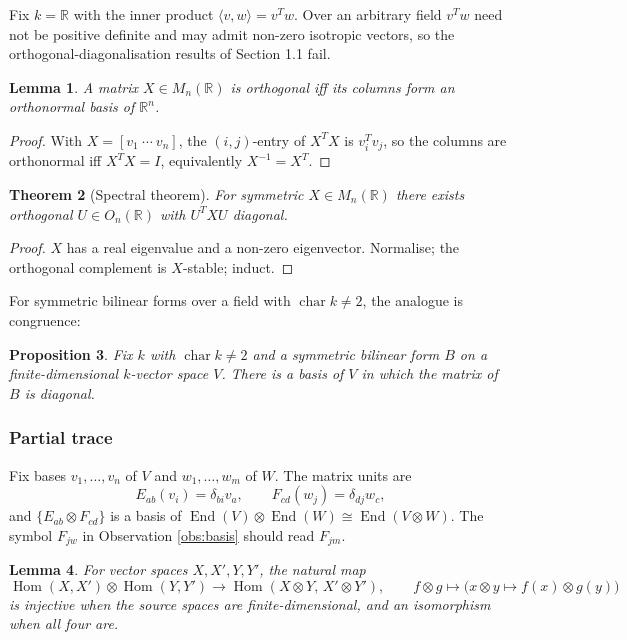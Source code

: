 \documentclass[12pt]{article}
\theoremstyle{plain}
\newtheorem{thm}{Theorem}[subsection] %
\newtheorem{proposition}[thm]{Proposition}
\newtheorem{lemma}[thm]{Lemma}
\theoremstyle{definition}
\begin{document}
Fix $k=\mathbb{R}$ with the inner product $\langle v,w\rangle=v^Tw$. Over an arbitrary field $v^Tw$ need not be positive definite and may admit non-zero isotropic vectors, so the orthogonal-diagonalisation results of Section 1.1 fail.

\begin{lemma}\label{lem:orthonormal_corr}
A matrix $X\in M_n(\mathbb{R})$ is orthogonal iff its columns form an orthonormal basis of $\mathbb{R}^n$.
\end{lemma}
\begin{proof}
With $X=[v_1\ \cdots\ v_n]$, the $(i,j)$-entry of $X^TX$ is $v_i^Tv_j$, so the columns are orthonormal iff $X^TX=I$, equivalently $X^{-1}=X^T$.
\end{proof}

\begin{thm}[Spectral theorem]\label{thm:spectral_real}
For symmetric $X\in M_n(\mathbb{R})$ there exists orthogonal $U\in O_n(\mathbb{R})$ with $U^TXU$ diagonal.
\end{thm}
\begin{proof}
$X$ has a real eigenvalue and a non-zero eigenvector. Normalise; the orthogonal complement is $X$-stable; induct.
\end{proof}

For symmetric bilinear forms over a field with $\operatorname{char}k\ne 2$, the analogue is congruence:
\begin{proposition}\label{prop:cong_diag}
Fix $k$ with $\operatorname{char}k\ne 2$ and a symmetric bilinear form $B$ on a finite-dimensional $k$-vector space $V$. There is a basis of $V$ in which the matrix of $B$ is diagonal.
\end{proposition}

\subsubsection*{Partial trace}

Fix bases $v_1,\ldots,v_n$ of $V$ and $w_1,\ldots,w_m$ of $W$. The matrix units are
\[
E_{ab}(v_i)=\delta_{bi}v_a,\qquad F_{cd}(w_j)=\delta_{dj}w_c,
\]
and $\{E_{ab}\otimes F_{cd}\}$ is a basis of $\operatorname{End}(V)\otimes\operatorname{End}(W)\cong\operatorname{End}(V\otimes W)$. The symbol $F_{jw}$ in Observation \ref{obs:basis} should read $F_{jm}$.

\begin{lemma}\label{lem:hom_tensor_corr}
For vector spaces $X,X',Y,Y'$, the natural map
\[
\operatorname{Hom}(X,X')\otimes\operatorname{Hom}(Y,Y')\longrightarrow\operatorname{Hom}(X\otimes Y,\,X'\otimes Y'),\qquad f\otimes g\longmapsto\big(x\otimes y\mapsto f(x)\otimes g(y)\big)
\]
is injective when the source spaces are finite-dimensional, and an isomorphism when all four are.
\end{lemma}
\end{document}
